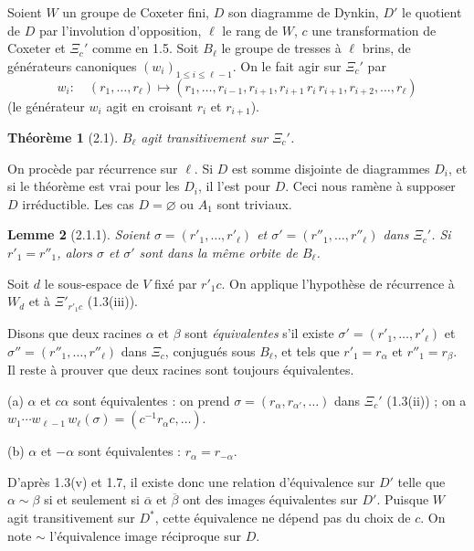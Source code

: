 \documentclass[11pt,a4paper]{article}
\theoremstyle{plain}
\newtheorem{theorem}{Th\'eor\`eme}[section]
\newtheorem{lemma}[theorem]{Lemme}
\theoremstyle{definition}
\begin{document}
Soient $W$ un groupe de Coxeter fini, $D$ son diagramme de Dynkin, $D'$ le quotient de $D$ par l'involution d'opposition, $\ell$ le rang de $W$, $c$ une transformation de Coxeter et $\Xi_c'$ comme en 1.5. Soit $B_\ell$ le groupe de tresses \`a $\ell$ brins, de g\'en\'erateurs canoniques $(w_i)_{1 \leq i \leq \ell-1}$. On le fait agir sur $\Xi_c'$ par
\[
w_i : \quad (r_1, \ldots, r_\ell) \longmapsto (r_1, \ldots, r_{i-1}, r_{i+1}, r_{i+1}\, r_i\, r_{i+1}, r_{i+2}, \ldots, r_\ell)
\]
(le g\'en\'erateur $w_i$ agit en croisant $r_i$ et $r_{i+1}$).

\begin{theorem}[2.1]
$B_\ell$ agit transitivement sur $\Xi_c'$.
\end{theorem}

On proc\`ede par r\'ecurrence sur $\ell$. Si $D$ est somme disjointe de diagrammes $D_i$, et si le th\'eor\`eme est vrai pour les $D_i$, il l'est pour $D$. Ceci nous ram\`ene \`a supposer $D$ irr\'eductible. Les cas $D = \varnothing$ ou $A_1$ sont triviaux.

\begin{lemma}[2.1.1]
Soient $\sigma = (r'_1, \ldots, r'_\ell)$ et $\sigma' = (r''_1, \ldots, r''_\ell)$ dans $\Xi_c'$. Si $r'_1 = r''_1$, alors $\sigma$ et $\sigma'$ sont dans la m\^eme orbite de $B_\ell$.
\end{lemma}

Soit $d$ le sous-espace de $V$ fix\'e par $r'_1 c$. On applique l'hypoth\`ese de r\'ecurrence \`a $W_d$ et \`a $\Xi'_{r'_1 c}$ (1.3(iii)).

\smallskip

Disons que deux racines $\alpha$ et $\beta$ sont \emph{\'equivalentes} s'il existe $\sigma' = (r'_1, \ldots, r'_\ell)$ et $\sigma'' = (r''_1, \ldots, r''_\ell)$ dans $\Xi_c$, conjugu\'es sous $B_\ell$, et tels que $r'_1 = r_\alpha$ et $r''_1 = r_\beta$. Il reste \`a prouver que deux racines sont toujours \'equivalentes.

\smallskip

(a) $\alpha$ et $c\alpha$ sont \'equivalentes : on prend $\sigma = (r_\alpha, r_{\alpha'}, \ldots)$ dans $\Xi_c'$ (1.3(ii)) ; on a $w_1 \cdots w_{\ell-1}\, w_\ell(\sigma) = (c^{-1} r_\alpha c, \ldots)$.

\smallskip

\newpage

(b) $\alpha$ et $-\alpha$ sont \'equivalentes : $r_\alpha = r_{-\alpha}$.

D'apr\`es 1.3(v) et 1.7, il existe donc une relation d'\'equivalence sur $D'$ telle que $\alpha \sim \beta$ si et seulement si $\overline{\alpha}$ et $\overline{\beta}$ ont des images \'equivalentes sur $D'$. Puisque $W$ agit transitivement sur $D^*$, cette \'equivalence ne d\'epend pas du choix de $c$. On note $\sim$ l'\'equivalence image r\'eciproque sur $D$.
\end{document}
